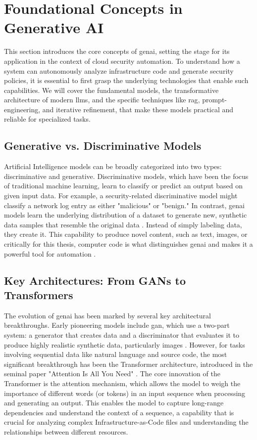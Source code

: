 \section{Foundational Concepts in Generative AI}
\label{sec:foundational_genai}

This section introduces the core concepts of \gls{genai}, setting the stage for its application in the context of cloud security automation. To understand how a system can autonomously analyze infrastructure code and generate security policies, it is essential to first grasp the underlying technologies that enable such capabilities. We will cover the fundamental models, the transformative architecture of modern \glspl{llm}, and the specific techniques like \gls{rag}, \gls{prompt-engineering}, and iterative refinement, that make these models practical and reliable for specialized tasks.

\subsection{Generative vs. Discriminative Models}
Artificial Intelligence models can be broadly categorized into two types: discriminative and generative. Discriminative models, which have been the focus of traditional machine learning, learn to classify or predict an output based on given input data. For example, a security-related discriminative model might classify a network log entry as either "malicious" or "benign." In contrast, \gls{genai} models learn the underlying distribution of a dataset to generate new, synthetic data samples that resemble the original data \cite{kaswan_generative_2023}. Instead of simply labeling data, they create it. This capability to produce novel content, such as text, images, or critically for this thesis, computer code is what distinguishes \gls{genai} and makes it a powerful tool for automation \cite{gatla_advancements_2024}.

\subsection{Key Architectures: From GANs to Transformers}
The evolution of \gls{genai} has been marked by several key architectural breakthroughs. Early pioneering models include \gls{gan}, which use a two-part system: a generator that creates data and a discriminator that evaluates it to produce highly realistic synthetic data, particularly images \cite{goodfellow_generative_2014}. However, for tasks involving sequential data like natural language and source code, the most significant breakthrough has been the Transformer architecture, introduced in the seminal paper "Attention Is All You Need" \cite{vaswani_attention_2023}. The core innovation of the Transformer is the attention mechanism, which allows the model to weigh the importance of different words (or tokens) in an input sequence when processing and generating an output. This enables the model to capture long-range dependencies and understand the context of a sequence, a capability that is crucial for analyzing complex Infrastructure-as-Code files and understanding the relationships between different resources.

